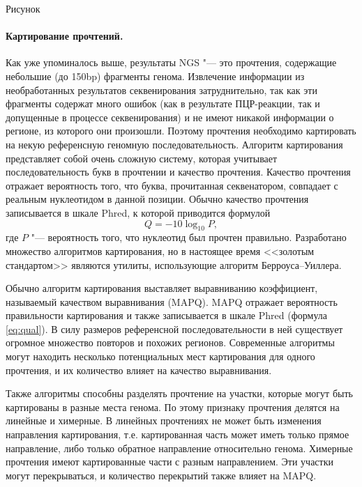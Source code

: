 \documentclass[a4paper,12pt]{article}
\begin{document}
\begin{Huge}Рисунок\end{Huge}

\paragraph{Картирование прочтений.}
Как уже упоминалось выше, результаты NGS "--- это прочтения, содержащие небольшие (до 150bp) фрагменты генома.
Извлечение информации из необработанных результатов секвенирования затруднительно, так как эти фрагменты содержат много ошибок (как в результате ПЦР-реакции, так и допущенные в процессе секвенирования) и не имеют никакой информации о регионе, из которого они произошли.
Поэтому прочтения необходимо картировать на некую референсную геномную последовательность.
Алгоритм картирования представляет собой очень сложную систему, которая учитывает последовательность букв в прочтении и качество прочтения.
Качество прочтения отражает вероятность того, что буква, прочитанная секвенатором, совпадает с реальным нуклеотидом в данной позиции.
Обычно качество прочтения записывается в шкале Phred, к которой приводится формулой \begin{equation}Q = -10\log_{10}P,\label{eq:qual}\end{equation} где $P$ "--- вероятность того, что нуклеотид был прочтен правильно.
Разработано множество алгоритмов картирования, но в настоящее время <<золотым стандартом>> являются утилиты, использующие алгоритм Берроуса--Уиллера\cite{burrows}.

Обычно алгоритм картирования выставляет выравниванию коэффициент, называемый качеством выравнивания (MAPQ).
MAPQ отражает вероятность правильности картирования и также записывается в шкале Phred (формула \ref{eq:qual}).
В силу размеров референсной последовательности в ней существует огромное множество повторов и похожих регионов.
Современные алгоритмы могут находить несколько потенциальных мест картирования для одного прочтения, и их количество влияет на качество выравнивания.

Также алгоритмы способны разделять прочтение на участки, которые могут быть картированы в разные места генома.
По этому признаку прочтения делятся на линейные и химерные.
В линейных прочтениях не может быть изменения направления картирования, т.е. картированная часть может иметь только прямое направление, либо только обратное направление относительно генома.
Химерные прочтения имеют картированные части с разным направлением.
Эти участки могут перекрываться, и количество перекрытий также влияет на MAPQ.
\end{document}
